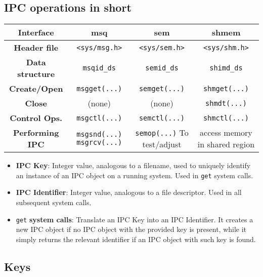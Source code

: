 \documentclass{article}
\begin{document}
\subsection{IPC operations in short}

\begin{center}
\begin{tabular}{ |c|c|c|c| }
    \hline \textbf{Interface} & \textbf{msq} & \textbf{sem} & \textbf{shmem} \\ \hline
    \textbf{Header file} & \texttt{<sys/msg.h>} & \texttt{<sys/sem.h>} & \texttt{<sys/shm.h>} \\ \hline
    \textbf{Data structure} & \texttt{msqid\_ds} & \texttt{semid\_ds} & \texttt{shimd\_ds} \\ \hline
    \textbf{Create/Open} & \texttt{msgget(...)} & \texttt{semget(...)} & \texttt{shmget(...)} \\ \hline
    \textbf{Close} & (none) & (none) & \texttt{shmdt(...)} \\ \hline
    \textbf{Control Ops.} & \texttt{msgctl(...)} & \texttt{semctl(...)} & \texttt{shmctl(...)} \\ \hline
    \textbf{Performing IPC} & \multicolumn{1}{p{2cm}|}{\texttt{msgsnd(...)} \newline \texttt{msgrcv(...)}} & \multicolumn{1}{p{2cm}|}{\texttt{semop(...)} \newline To test/adjust} &  \multicolumn{1}{p{2cm}|}{access memory in shared region} \\ \hline
\end{tabular}
\end{center}

\begin{itemize}
    \item \textbf{IPC Key}: Integer value, analogous to a filename, used to uniquely identify an instance of an IPC object on a running system. Used in \texttt{get} system calls.
    \item \textbf{IPC Identifier}: Integer value, analogous to a file descriptor. Used in all subsequent system calls.
    \item \texttt{get} \textbf{system calls}: Translate an IPC Key into an IPC Identifier. It creates a new IPC object if no IPC object with the provided key is present, while it simply returns the relevant identifier if an IPC object with such key is found.
\end{itemize}

\subsection{Keys}
\end{document}
